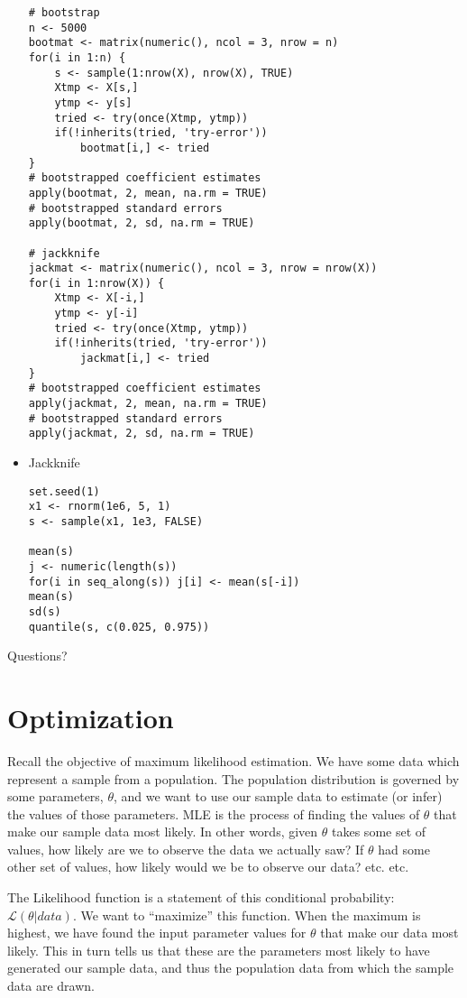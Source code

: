 \documentclass[a4paper,12pt]{article}
\newcommand{\lik}{\mathcal{L}}
\begin{document}
\begin{itemize}
\begin{lstlisting}
# bootstrap
n <- 5000
bootmat <- matrix(numeric(), ncol = 3, nrow = n)
for(i in 1:n) {
    s <- sample(1:nrow(X), nrow(X), TRUE)
    Xtmp <- X[s,]
    ytmp <- y[s]
    tried <- try(once(Xtmp, ytmp))
    if(!inherits(tried, 'try-error'))
        bootmat[i,] <- tried
}
# bootstrapped coefficient estimates
apply(bootmat, 2, mean, na.rm = TRUE)
# bootstrapped standard errors
apply(bootmat, 2, sd, na.rm = TRUE)

# jackknife
jackmat <- matrix(numeric(), ncol = 3, nrow = nrow(X))
for(i in 1:nrow(X)) {
    Xtmp <- X[-i,]
    ytmp <- y[-i]
    tried <- try(once(Xtmp, ytmp))
    if(!inherits(tried, 'try-error'))
        jackmat[i,] <- tried
}
# bootstrapped coefficient estimates
apply(jackmat, 2, mean, na.rm = TRUE)
# bootstrapped standard errors
apply(jackmat, 2, sd, na.rm = TRUE)
\end{lstlisting}



\item Jackknife

\begin{lstlisting}
set.seed(1)
x1 <- rnorm(1e6, 5, 1)
s <- sample(x1, 1e3, FALSE)

mean(s)
j <- numeric(length(s))
for(i in seq_along(s)) j[i] <- mean(s[-i])
mean(s)
sd(s)
quantile(s, c(0.025, 0.975))
\end{lstlisting}

\end{itemize}



Questions? 


\section{Optimization}

Recall the objective of maximum likelihood estimation. We have some data which represent a sample from a population. The population distribution is governed by some parameters, $\theta$, and we want to use our sample data to estimate (or infer) the values of those parameters. MLE is the process of finding the values of $\theta$ that make our sample data most likely. In other words, given $\theta$ takes some set of values, how likely are we to observe the data we actually saw? If $\theta$ had some other set of values, how likely would we be to observe our data? etc. etc.

The Likelihood function is a statement of this conditional probability: $\lik(\theta|data)$. We want to ``maximize'' this function. When the maximum is highest, we have found the input parameter values for $\theta$ that make our data most likely. This in turn tells us that these are the parameters most likely to have generated our sample data, and thus the population data from which the sample data are drawn.
\end{document}
